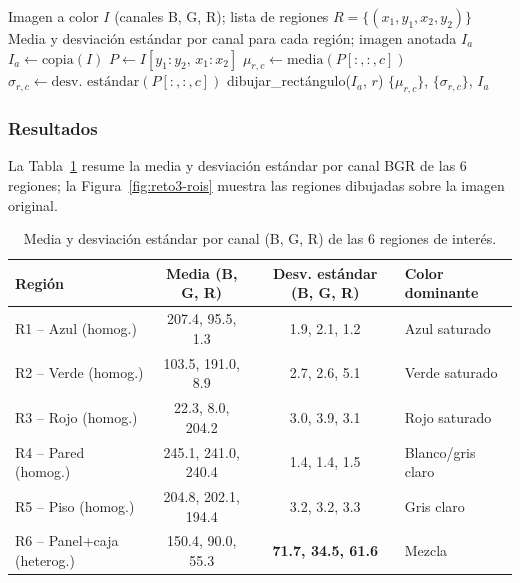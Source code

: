 \documentclass[11pt]{article}
\begin{document}
\begin{algorithm}
\caption{Extracción y caracterización estadística de regiones de interés}
\label{alg:roi}
\begin{algorithmic}[1]
\Require Imagen a color $I$ (canales B, G, R); lista de regiones $R = \{(x_1,y_1,x_2,y_2)\}$
\Ensure Media y desviación estándar por canal para cada región; imagen anotada $I_a$
\State $I_a \gets \text{copia}(I)$
    \State $P \gets I[y_1{:}y_2,\, x_1{:}x_2]$ 
        \State $\mu_{r,c} \gets \text{media}(P[:,:,c])$
        \State $\sigma_{r,c} \gets \text{desv.\ estándar}(P[:,:,c])$
    \EndFor
    \State dibujar\_rectángulo($I_a$, $r$)
\EndFor
\State \Return $\{\mu_{r,c}\}$, $\{\sigma_{r,c}\}$, $I_a$
\end{algorithmic}
\end{algorithm}

\subsubsection{Resultados}
La Tabla~\ref{tab:reto3-roi} resume la media y desviación estándar por
canal BGR de las 6 regiones; la Figura~\ref{fig:reto3-rois} muestra las
regiones dibujadas sobre la imagen original.

\begin{table}[h]
\centering
\caption{Media y desviación estándar por canal (B, G, R) de las 6 regiones de interés.}
\label{tab:reto3-roi}
\begin{tabular}{lccl}
\toprule
Región & Media (B, G, R) & Desv. estándar (B, G, R) & Color dominante \\
\midrule
R1 -- Azul (homog.) & 207.4, 95.5, 1.3 & 1.9, 2.1, 1.2 & Azul saturado \\
R2 -- Verde (homog.) & 103.5, 191.0, 8.9 & 2.7, 2.6, 5.1 & Verde saturado \\
R3 -- Rojo (homog.) & 22.3, 8.0, 204.2 & 3.0, 3.9, 3.1 & Rojo saturado \\
R4 -- Pared (homog.) & 245.1, 241.0, 240.4 & 1.4, 1.4, 1.5 & Blanco/gris claro \\
R5 -- Piso (homog.) & 204.8, 202.1, 194.4 & 3.2, 3.2, 3.3 & Gris claro \\
R6 -- Panel+caja (heterog.) & 150.4, 90.0, 55.3 & \textbf{71.7, 34.5, 61.6} & Mezcla \\
\bottomrule
\end{tabular}
\end{table}
\end{document}
